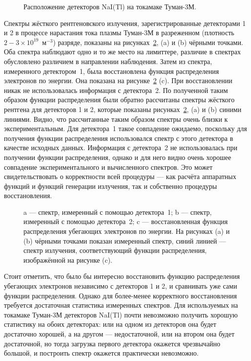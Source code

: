 \begin{figure}[ht!]
  \caption{ Расположение детекторов NaI(Tl) на токамаке Туман-3М.~\cite{Shevelev2013} }
  \label{fig:tumanHxdDetectors}
\end{figure}

Спектры жёсткого рентгеновского излучения, зарегистрированные детекторами 1 и 2 в процессе нарастания тока плазмы Туман-3М в разреженном (плотность $2-3 \times 10^{19}$~м${}^{-3}$) разряде, показаны на рисунках~\ref{fig:tumanHxdSpectrumsEdf}, (a) и (b) чёрными точками. Оба спектра наблюдают одно и то же место на лимиттере, различие в спектрах обусловлено различием в направлении наблюдения. Затем из спектра, измеренного детектором~1, была восстановлена функция распределения электронов по энергии. Она показана на рисунке~\ref{fig:tumanHxdSpectrumsEdf} (c). При восстановлении никак не использовалась информация с детектора~2. По полученной таким образом функции распределения были обратно рассчитаны спектры жёсткого рентгена для детекторов 1 и 2, которые показаны рисунках~\ref{fig:tumanHxdSpectrumsEdf}, (a) и (b) синими линиями. Видно, что рассчитанные таким образом спектры очень близки к экспериментальным. Для детектора~1 такое совпадение ожидаемо, поскольку для получения функции распределения использовался спектр с этого детектора в качестве исходных данных. Информация с детектора~2 не использовалась при получении функции распределения, однако и для него видно очень хорошее совпадение экспериментального и вычисленного спектров. Это может свидетельствовать о корректности всей процедуры --- как расчёта аппаратных функций и функций генерации излучения, так и собственно процедуры восстановления.~\cite{Shevelev2013}

\begin{figure}[ht!]
  \caption{ a --- спектр, измеренный с помощью детектора~1; b --- спектр, измеренный с помощью детектора~2; c --- восстановленная функция распределения убегающих электронов по энергии. На рисунках (a) и (b) чёрными точками показан измеренный спектр, синий линией --- спектр излучения, соответствующий функции распределения, изображённой на рисунке (c).~\cite{Shevelev2013} }
  \label{fig:tumanHxdSpectrumsEdf}
\end{figure}

Стоит отметить, что было бы интересно восстановить функцию распределения убегающих электронов независимо с детекторов 1 и 2, и сравнивать уже сами функции распределения. Однако для более-менее корректного восстановления требуется достаточная статистика измеренных спектров. Для используемых на токамаке Туман-3М детекторов NaI(Tl) почти невозможно получить хорошую статистику на обоих детекторах: или на одном из детекторов она будет достаточно хорошей, а на другом --- недостаточной, или на втором она будет достаточной, но тогда загрузка первого детектора окажется чрезвычайно большой, и построить спектр окажется практически невозможно. 

